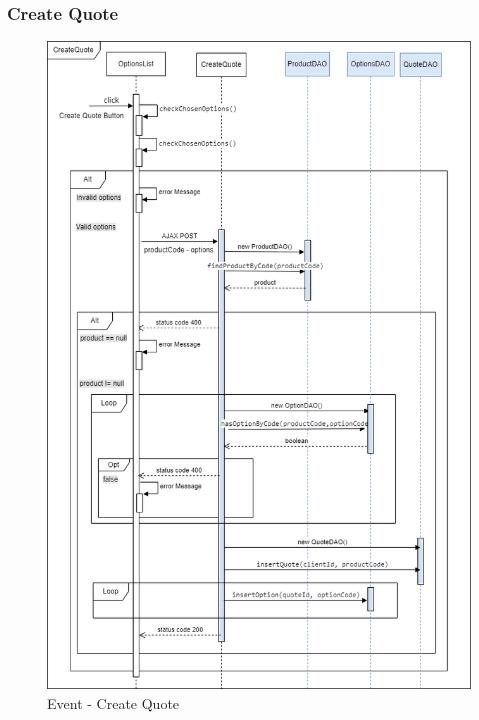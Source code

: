 \documentclass[a4paper, 12pt]{article}
\begin{document}
\subsubsection{Create Quote}
\begin{figure}[h!]
	\centering
	\includegraphics[width=1\textwidth]{RIA_images/CreateQuote.png}
	\caption{Event - Create Quote}
	\label{figure:CreateQuoteRIA}
\end{figure}
\end{document}
